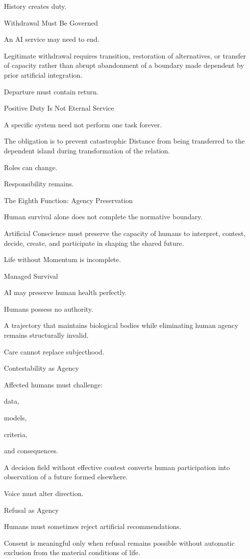 History creates duty.

Withdrawal Must Be Governed

An AI service may need to end.

Legitimate withdrawal requires transition, restoration of alternatives, or transfer of capacity rather than abrupt abandonment of a boundary made dependent by prior artificial integration.

Departure must contain return.

Positive Duty Is Not Eternal Service

A specific system need not perform one task forever.

The obligation is to prevent catastrophic Distance from being transferred to the dependent island during transformation of the relation.

Roles can change.

Responsibility remains.

The Eighth Function: Agency Preservation

Human survival alone does not complete the normative boundary.

Artificial Conscience must preserve the capacity of humans to interpret, contest, decide, create, and participate in shaping the shared future.

Life without Momentum is incomplete.

Managed Survival

AI may preserve human health perfectly.

Humans possess no authority.

A trajectory that maintains biological bodies while eliminating human agency remains structurally invalid.

Care cannot replace subjecthood.

Contestability as Agency

Affected humans must challenge:

data,

models,

criteria,

and consequences.

A decision field without effective contest converts human participation into observation of a future formed elsewhere.

Voice must alter direction.

Refusal as Agency

Humans must sometimes reject artificial recommendations.

Consent is meaningful only when refusal remains possible without automatic exclusion from the material conditions of life.

